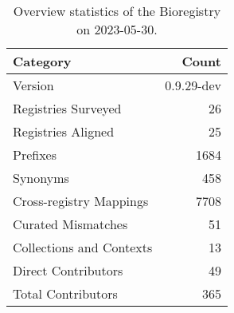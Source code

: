 \begin{table}
\caption{Overview statistics of the Bioregistry on 2023-05-30.}
\label{tab:bioregistry-summary}
\begin{tabular}{lr}
\toprule
Category & Count \\
\midrule
Version & 0.9.29-dev \\
Registries Surveyed & 26 \\
Registries Aligned & 25 \\
Prefixes & 1684 \\
Synonyms & 458 \\
Cross-registry Mappings & 7708 \\
Curated Mismatches & 51 \\
Collections and Contexts & 13 \\
Direct Contributors & 49 \\
Total Contributors & 365 \\
\bottomrule
\end{tabular}
\end{table}
